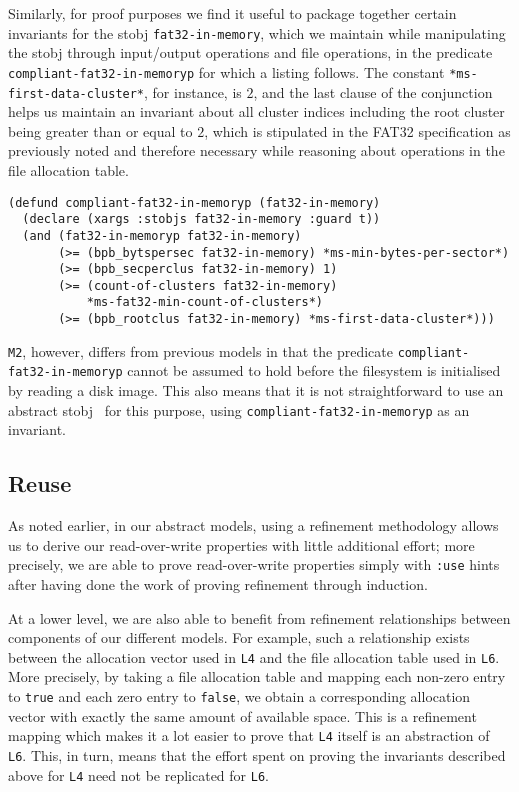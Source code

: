 \documentclass[submission,copyright,creativecommons]{eptcs}
\begin{document}
Similarly, for proof purposes we find it useful to package together
certain invariants for the stobj \texttt{fat32-in-memory}, which we
maintain while manipulating the stobj through input/output operations
and file operations, in the predicate
\texttt{compliant-fat32-in-memoryp} for which a listing follows. The
constant \texttt{*ms-first-data-cluster*}, for instance, is $2$, and
the last clause of the conjunction helps us maintain an invariant
about all cluster indices including the root cluster being greater
than or equal to $2$, which is stipulated in the FAT32 specification
as previously noted and therefore necessary while reasoning about
operations in the file allocation table.

\medskip

\noindent
\begin{verbatim}
(defund compliant-fat32-in-memoryp (fat32-in-memory)
  (declare (xargs :stobjs fat32-in-memory :guard t))
  (and (fat32-in-memoryp fat32-in-memory)
       (>= (bpb_bytspersec fat32-in-memory) *ms-min-bytes-per-sector*)
       (>= (bpb_secperclus fat32-in-memory) 1)
       (>= (count-of-clusters fat32-in-memory)
           *ms-fat32-min-count-of-clusters*)
       (>= (bpb_rootclus fat32-in-memory) *ms-first-data-cluster*)))
\end{verbatim}

\texttt{M2}, however, differs from previous models in that the
predicate \texttt{compliant-fat32-in-memoryp} cannot be assumed to
hold before the filesystem is initialised by reading a disk
image. This also means that it is not straightforward to use an
abstract stobj~\cite{goel2013abstract} for this purpose, using
\texttt{compliant-fat32-in-memoryp} as an invariant.

\subsection{Reuse}

As noted earlier, in our abstract models, using a refinement
methodology allows us to derive our read-over-write properties
with little additional effort; more precisely, we are able to prove
read-over-write properties simply with \texttt{:use} hints after
having done the work of proving refinement through induction.

At a lower level, we are also able to benefit from refinement
relationships between components of our different models. For example,
such a relationship exists between the allocation vector used in
\texttt{L4} and the file allocation table used in \texttt{L6}. More
precisely, by taking a file allocation table and mapping each non-zero
entry to \texttt{true} and each zero entry to \texttt{false}, we
obtain a corresponding allocation vector with exactly the same amount
of available space. This is a refinement mapping which makes it a lot
easier to prove that \texttt{L4} itself is an abstraction of
\texttt{L6}. This, in turn, means that the effort spent on proving the
invariants described above for \texttt{L4} need not be replicated for
\texttt{L6}.
\end{document}

